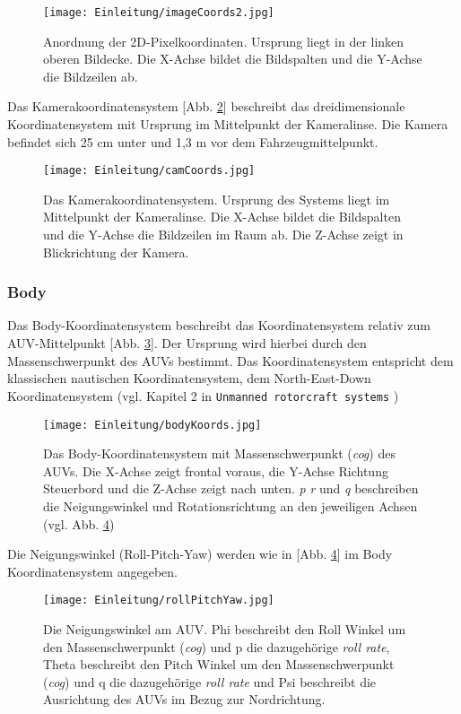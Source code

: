 \begin{figure}[H]
	\centering
	\texttt{[image: Einleitung/imageCoords2.jpg]}
	\caption[Das Bildkoordinatensystem]{Anordnung der 2D-Pixelkoordinaten. Ursprung liegt in der linken oberen Bildecke. Die X-Achse bildet die Bildspalten und die Y-Achse die Bildzeilen ab.}
	\label{imageKoords}
\end{figure}
Das Kamerakoordinatensystem [Abb. \ref{CamKoords}] beschreibt das dreidimensionale Koordinatensystem mit Ursprung im Mittelpunkt der Kameralinse. Die Kamera befindet sich 25 cm unter und 1,3 m vor dem Fahrzeugmittelpunkt.
\begin{figure}[H]
	\centering
	\texttt{[image: Einleitung/camCoords.jpg]}
	\caption[Das Kamerakoordinatensystem]{Das Kamerakoordinatensystem. Ursprung des Systems liegt im Mittelpunkt der Kameralinse. Die X-Achse bildet die Bildspalten und die Y-Achse die Bildzeilen im Raum ab. Die Z-Achse zeigt in Blickrichtung der Kamera.}
	\label{CamKoords}
\end{figure}

\subsubsection{Body}
Das Body-Koordinatensystem beschreibt das Koordinatensystem relativ zum AUV-Mittelpunkt [Abb. \ref{Abb. 1}].
Der Ursprung wird hierbei durch den Massenschwerpunkt des AUVs bestimmt.
Das Koordinatensystem entspricht dem klassischen nautischen Koordinatensystem, dem North-East-Down Koordinatensystem (vgl. Kapitel 2 in \texttt{Unmanned rotorcraft systems} \cite{cai2011unmanned})
\begin{figure}[H]
	\centering
	\texttt{[image: Einleitung/bodyKoords.jpg]}
	\caption[Das Body-Koordinatensystem]{Das Body-Koordinatensystem mit Massenschwerpunkt (\textit{cog}) des AUVs. Die X-Achse zeigt frontal voraus, die Y-Achse Richtung Steuerbord und die Z-Achse zeigt nach unten. \textit{p} \textit{r} und \textit{q} beschreiben die Neigungswinkel und Rotationsrichtung an den jeweiligen Achsen (vgl. Abb. \ref{Abb. 2})}
	\label{Abb. 1}
\end{figure}

Die Neigungswinkel (Roll-Pitch-Yaw) werden wie in [Abb. \ref{Abb. 2}] im Body Koordinatensystem angegeben.
\begin{figure}[H]
	\centering
	\texttt{[image: Einleitung/rollPitchYaw.jpg]}
	\caption[Die Neigungswinkel im Body-Koordinatensystem]{Die Neigungswinkel am AUV. Phi beschreibt den Roll Winkel um den Massenschwerpunkt (\textit{cog}) und p die dazugehörige \textit{roll rate},  Theta beschreibt den Pitch Winkel um den Massenschwerpunkt (\textit{cog}) und q die dazugehörige \textit{roll rate} und  Psi beschreibt die Ausrichtung des AUVs im Bezug zur Nordrichtung.}
	\label{Abb. 2}
\end{figure}

